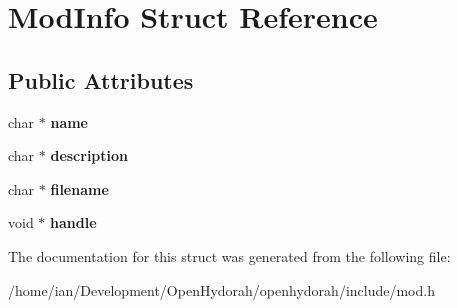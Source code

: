 \hypertarget{structModInfo}{\section{Mod\-Info Struct Reference}
\label{structModInfo}
}
\subsection*{Public Attributes}
\begin{DoxyCompactItemize}
\item 
\hypertarget{structModInfo_a5a39aaf51db167d7334f616698b84ee2}{char $\ast$ {\bfseries name}}\label{structModInfo_a5a39aaf51db167d7334f616698b84ee2}

\item 
\hypertarget{structModInfo_a95473892d90b107f9e29ae211b3a7b36}{char $\ast$ {\bfseries description}}\label{structModInfo_a95473892d90b107f9e29ae211b3a7b36}

\item 
\hypertarget{structModInfo_ac0c2ec981103d85d1cf4a0fd61fa3b29}{char $\ast$ {\bfseries filename}}\label{structModInfo_ac0c2ec981103d85d1cf4a0fd61fa3b29}

\item 
\hypertarget{structModInfo_a1476e7a3bafbf936b7b8c3a1a60c5589}{void $\ast$ {\bfseries handle}}\label{structModInfo_a1476e7a3bafbf936b7b8c3a1a60c5589}

\end{DoxyCompactItemize}


The documentation for this struct was generated from the following file\-:\begin{DoxyCompactItemize}
\item 
/home/ian/\-Development/\-Open\-Hydorah/openhydorah/include/mod.\-h\end{DoxyCompactItemize}
